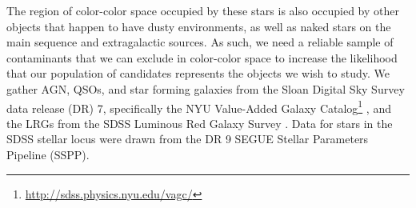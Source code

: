 The region of color-color space occupied by these stars is also occupied by other objects that happen to have dusty environments, as well as naked stars on the main sequence and extragalactic sources. As such, we need a reliable sample of contaminants that we can exclude in color-color space to increase the likelihood that our population of candidates represents the objects we wish to study. We gather AGN, QSOs, and star forming galaxies from the Sloan Digital Sky Survey \citep{2000AJ....120.1579Y} data release (DR) 7, specifically the NYU Value-Added Galaxy Catalog\footnote{\url{http://sdss.physics.nyu.edu/vagc/}} \citep[VAGC]{2005AJ....129.2562B}, and the LRGs from the SDSS Luminous Red Galaxy Survey \citep{2010ApJ...710.1444K}. Data for stars in the SDSS stellar locus \citep{2014MNRAS.440.3430D} were drawn from the DR 9 SEGUE Stellar Parameters Pipeline (SSPP).

